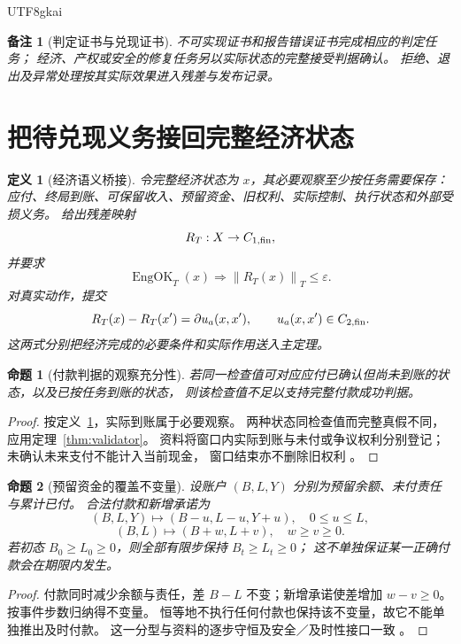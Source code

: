 \documentclass[12pt,a4paper,openany]{report}
\newtheorem{definition}{定义}[chapter]
\newtheorem{proposition}{命题}[chapter]
\newtheorem{remark}{备注}[chapter]
\numberwithin{equation}{chapter}
\newcommand{\EngOK}{\operatorname{EngOK}}
\newcommand{\Norm}[1]{\left\lVert#1\right\rVert}
\begin{document}
\begin{CJK*}{UTF8}{gkai}
\begin{remark}[判定证书与兑现证书]
不可实现证书和报告错误证书完成相应的判定任务；
经济、产权或安全的修复任务另以实际状态的完整接受判据确认。
拒绝、退出及异常处理按其实际效果进入残差与发布记录。
\end{remark}

\section{把待兑现义务接回完整经济状态}

\begin{definition}[经济语义桥接]
\label{def:econ-bridge}
令完整经济状态为 $x$，其必要观察至少按任务需要保存：
应付、终局到账、可保留收入、预留资金、旧权利、实际控制、执行状态和外部受损义务。
给出残差映射
\[
 R_T:X\to C_{1,\rm fin},
\]
并要求
\[
 \EngOK_T(x)\Longrightarrow\Norm{R_T(x)}_T\le\varepsilon.
\]
对真实动作，提交
\[
 R_T(x)-R_T(x')=\partial u_a(x,x'),\qquad u_a(x,x')\in C_{2,\rm fin}.
\]
这两式分别把经济完成的必要条件和实际作用送入主定理。
\end{definition}

\begin{proposition}[付款判据的观察充分性]
若同一检查值可对应应付已确认但尚未到账的状态，以及已按任务到账的状态，
则该检查值不足以支持完整付款成功判据。
\end{proposition}
\begin{proof}
按定义~\ref{def:econ-bridge}，实际到账属于必要观察。
两种状态同检查值而完整真假不同，应用定理~\ref{thm:validator}。
资料将窗口内实际到账与未付或争议权利分别登记；未确认未来支付不能计入当前现金，
窗口结束亦不删除旧权利
\cite[《后 AI 转型中的分配传导失灵与可核验治理》，“应付、到账与可保留收入的分离”节]{SourceSupplement}。
\end{proof}

\begin{proposition}[预留资金的覆盖不变量]
设账户 $(B,L,Y)$ 分别为预留余额、未付责任与累计已付。
合法付款和新增承诺为
\[
 (B,L,Y)\mapsto(B-u,L-u,Y+u),\quad0\le u\le L,
\]
\[
 (B,L)\mapsto(B+w,L+v),\quad w\ge v\ge0.
\]
若初态 $B_0\ge L_0\ge0$，则全部有限步保持 $B_t\ge L_t\ge0$；
这不单独保证某一正确付款会在期限内发生。
\end{proposition}
\begin{proof}
付款同时减少余额与责任，差 $B-L$ 不变；新增承诺使差增加 $w-v\ge0$。
按事件步数归纳得不变量。
恒等地不执行任何付款也保持该不变量，故它不能单独推出及时付款。
这一分型与资料的逐步守恒及安全／及时性接口一致
\cite[《偏好多样性、权利边界与可兑现分配》，“受保护账户的逐步守恒”节及
引理“不出错不等于能兑现”]{SourcePreference}。
\end{proof}


\end{CJK*}
\end{document}
